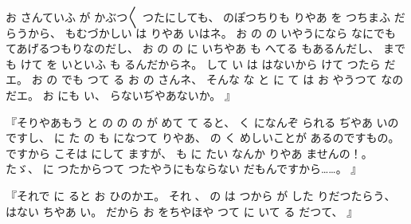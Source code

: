 お
さんていふ
が
かぶつ〳〵
つたにしても、
%
のぽつちりも
りやあ
を
つちまふ
だらうから、
%
もむづかしい
は
りやあ
いはネ。
%
お
の
の
いやうになら
なにでも
てあげるつもりなのだし、
%
お
の
の
に
いちやあ
も
へてる
もあるんだし、
%
までも
けて
を
いといふ
も
るんだからネ。
%
して
い
は
はないから
けて
つたら
だエ。
%
お
の
でも
つて
る
お
の
さんネ、
%
そんな
な
と
に
て
は
お
やうつて
なのだエ。
%
お
にも
い、
%
らないぢやあないか。
』

『そりやあもう
と
の
の
の
が
めて
て
ると、
%
く
になんぞ
られる
ぢやあ
いのですし、
%
に
た
の
も
になつて
りやあ、
%
の
く
めしいことが
あるのですもの。
%
ですから
こそは
にして
ますが、
%
も
に
たい
なんか
りやあ
ませんの！。
%
たゞ、
%
に
つたからつて
つたやうにもならない
だもんですから……。
』

『それで
に
ると
お
ひのかエ。
%
それ
、
%
の
は
つから
が
した
りだつたらう、
%
はない
ちやあ
い。
%
だから
お
をちやほや
つて
に
いて
る
だつて、
』

